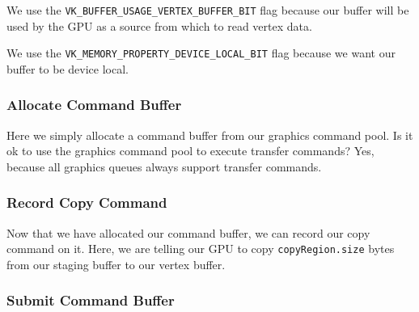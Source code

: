 We use the \texttt{VK\_BUFFER\_USAGE\_VERTEX\_BUFFER\_BIT} flag
because our buffer will be used by the GPU as a source from which
to read vertex data.

We use the \texttt{VK\_MEMORY\_PROPERTY\_DEVICE\_LOCAL\_BIT} flag
because we want our buffer to be device local.

\begin{minipage}{\linewidth}{\noindent}
    
\end{minipage}

\subsubsection{Allocate Command Buffer}

Here we simply allocate a command buffer from our graphics command pool.
Is it ok to use the graphics command pool to execute transfer commands?
Yes, because all graphics queues always support transfer commands.

\begin{minipage}{\linewidth}{\noindent}
    
\end{minipage}

\subsubsection{Record Copy Command}

Now that we have allocated our command buffer, we can record
our copy command on it.
Here, we are telling our GPU to copy \texttt{copyRegion.size} bytes
from our staging buffer to our vertex buffer.

\begin{minipage}{\linewidth}{\noindent}
    
\end{minipage}

\subsubsection{Submit Command Buffer}

